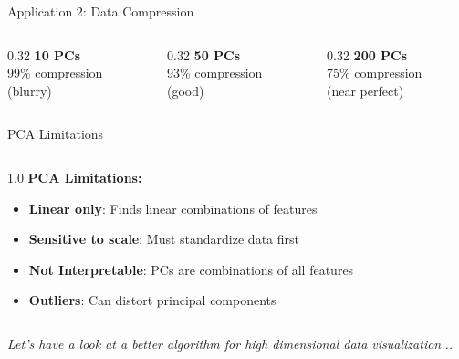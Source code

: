 \begin{frame}{Application 2: Data Compression}
\vspace{0.35em}
\begin{columns}[c]
\begin{column}{0.32\textwidth}
\centering
\small \textbf{10 PCs}\\99\% compression \\(blurry)
\end{column}
\begin{column}{0.32\textwidth}
\centering
\small \textbf{50 PCs}\\93\% compression \\(good)
\end{column}
\begin{column}{0.32\textwidth}
\centering
\small \textbf{200 PCs}\\75\% compression \\(near perfect)
\end{column}
\end{columns}

\end{frame}


\begin{frame}{PCA Limitations}

\begin{columns}[c]
\begin{column}{1.0\textwidth}
\textbf{PCA Limitations:}

\begin{itemize}
\item \textbf{Linear only}: Finds linear combinations of features
\item \textbf{Sensitive to scale}: Must standardize data first
\item \textbf{Not Interpretable}: PCs are combinations of all features
\item \textbf{Outliers}: Can distort principal components
\end{itemize}

\end{column}
\end{columns}

\vspace{1em}
\centering
\small \textit{Let's have a look at a better algorithm for high dimensional data visualization...}

\end{frame}




